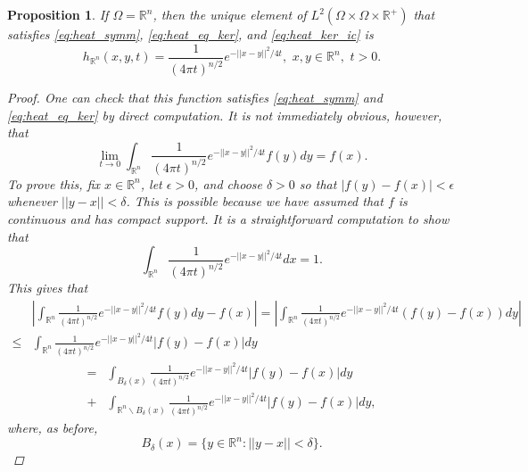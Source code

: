 \documentclass{amsart}
\newtheorem{proposition}[theorem]{Proposition}
\theoremstyle{definition}
\newcommand*{\R}{\mathbb{R}}
\begin{document}
\begin{proposition} \label{prop:heatkernel_R^n}
    If $\Omega = \R^n$, then the unique element of $L^2(\Omega \times \Omega \times \R^+)$ that satisfies \eqref{eq:heat_symm}, \eqref{eq:heat_eq_ker}, and \eqref{eq:heat_ker_ic} is 
    \begin{equation*}
            h_{\R^n}(x,y,t) = \frac{1}{(4\pi t)^{n/2}}e^{-||x-y||^2/4t}, \,\, x,y \in \R^n, \,\, t > 0.
    \end{equation*}
    \begin{proof}
    One can check that this function satisfies \eqref{eq:heat_symm} and \eqref{eq:heat_eq_ker} by direct computation.  It is not immediately obvious, however, that 
    \begin{equation*}
        \lim_{t \to 0} \int_{\R^n} \frac{1}{(4\pi t)^{n/2}}e^{-||x-y||^2/4t} f(y) dy = f(x). 
    \end{equation*}
    To prove this, fix $x \in \R^n$, let $\epsilon > 0$, and choose $\delta > 0$ so that $|f(y)-f(x)| < \epsilon$ whenever $||y-x|| < \delta$. This is possible because we have assumed that $f$ is continuous and has compact support.  It is a straightforward computation to show that
    \begin{equation*}
        \int_{\R^n} \frac{1}{(4\pi t)^{n/2}}e^{-||x-y||^2/4t} dx = 1.
    \end{equation*}
    This gives that
    \begin{align*}
        &\left|\int_{\R^n} \frac{1}{(4\pi t)^{n/2}}e^{-||x-y||^2/4t}f(y) dy - f(x) \right| = \left|\int_{\R^n} \frac{1}{(4\pi t)^{n/2}}e^{-||x-y||^2/4t}(f(y)-f(x)) dy \right| \\
        \leq &\int_{\R^n} \frac{1}{(4\pi t)^{n/2}}e^{-||x-y||^2/4t}|f(y)-f(x)| dy 
    \end{align*}
    \begin{equation} \label{eq:IJ}
        \begin{split}
            = &\int_{B_\delta(x)} \frac{1}{(4\pi t)^{n/2}}e^{-||x-y||^2/4t}|f(y)-f(x)| dy \\
            + &\int_{\R^n \backslash B_\delta(x)} \frac{1}{(4\pi t)^{n/2}}e^{-||x-y||^2/4t}|f(y)-f(x)| dy,
        \end{split}
    \end{equation}
    where, as before,
    \begin{equation*}
        B_\delta(x) = \{y \in \R^n : ||y-x|| < \delta\}.
    \end{equation*}

\end{proof}
\end{proposition}
\end{document}
